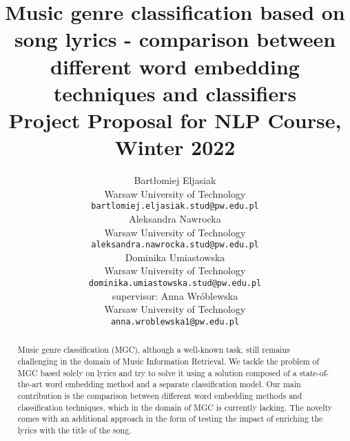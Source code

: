 \documentclass[11pt]{article}
\title{Music genre classification based on song lyrics - comparison between different word embedding techniques and classifiers \\Project Proposal for NLP Course, Winter 2022}
\author{Bartłomiej Eljasiak \\
  Warsaw University of Technology \\
  {\tt\small bartlomiej.eljasiak.stud@pw.edu.pl} \\\And
  Aleksandra Nawrocka \\
  Warsaw University of Technology \\
  {\tt\small aleksandra.nawrocka.stud@pw.edu.pl} \\
  \AND
  Dominika Umiastowska \\
  Warsaw University of Technology \\
  {\tt\small dominika.umiastowska.stud@pw.edu.pl} \\\And 
  supervisor: Anna Wróblewska\\
  Warsaw University of Technology \\
  {\tt\small anna.wroblewska1@pw.edu.pl}\\}
\date{}
\begin{document}
\raggedbottom

\maketitle

\vspace{5em}

\begin{abstract}

Music genre classification (MGC), although a well-known task, still remains challenging in the domain of Music Information Retrieval. We tackle the problem of MGC based solely on lyrics and try to solve it using a solution composed of a state-of-the-art word embedding method and a separate classification model. Our main contribution is the comparison between different word embedding methods and classification techniques, which in the domain of MGC is currently lacking. The novelty comes with an additional approach in the form of testing the impact of enriching the lyrics with the title of the song.

\end{abstract}















\printbibliography
\end{document}
